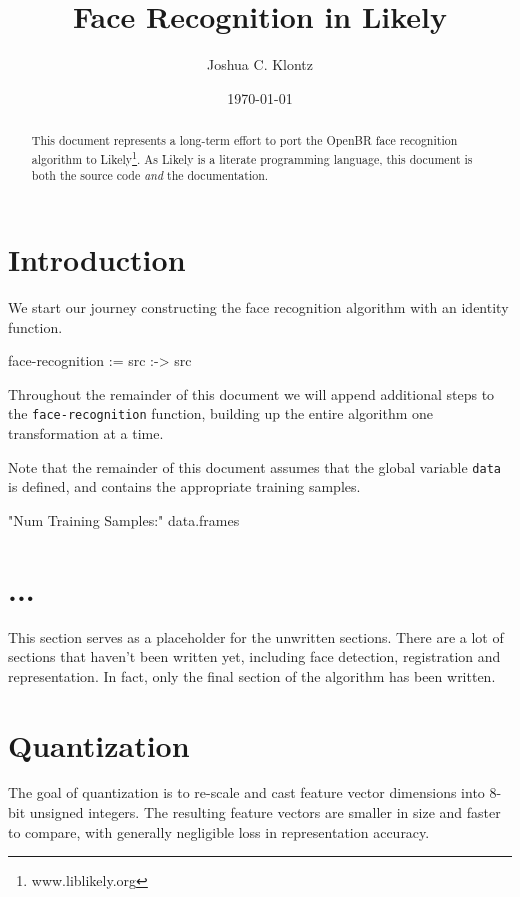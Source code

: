 \documentclass{article}
\title{Face Recognition in Likely}
\author{Joshua C. Klontz}
\date{\today}
\newenvironment{likely}
{ \verbatim }
{ \endverbatim }
\begin{document}
\maketitle

\begin{abstract}
This document represents a long-term effort to port the OpenBR face recognition algorithm to Likely\footnote{www.liblikely.org}.
As Likely is a literate programming language, this document is both the source code \emph{and} the documentation.
\end{abstract}

\section{Introduction}
We start our journey constructing the face recognition algorithm with an identity function.

\begin{likely}
face-recognition :=
  src :->
    src
\end{likely}

Throughout the remainder of this document we will append additional steps to the \texttt{face-recognition} function, building up the entire algorithm one transformation at a time.

Note that the remainder of this document assumes that the global variable \texttt{data} is defined, and contains the appropriate training samples.

\begin{likely}
"Num Training Samples:"
data.frames
\end{likely}

\section{...}
This section serves as a placeholder for the unwritten sections.
There are a lot of sections that haven't been written yet, including face detection, registration and representation.
In fact, only the final section of the algorithm has been written.

\section{Quantization}
The goal of quantization is to re-scale and cast feature vector dimensions into 8-bit unsigned integers.
The resulting feature vectors are smaller in size and faster to compare, with generally negligible loss in representation accuracy.
\end{document}
